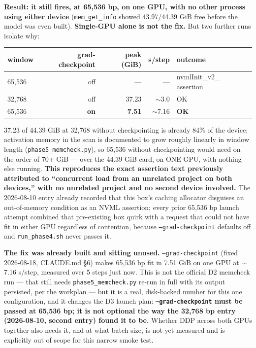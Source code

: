 \documentclass[11pt,a4paper]{article}
\newcommand{\code}[1]{\texttt{\small #1}}
\begin{document}
\textbf{Result: it still fires, at 65,536 bp, on one GPU, with no other process
using either device} (\code{mem\_get\_info} showed 43.97/44.39 GiB free before
the model was even built). \textbf{Single-GPU alone is not the fix.} But two
further runs isolate why:

\begin{center}
\begin{tabular}{lrrrl}
\toprule
window & grad-checkpoint & peak (GiB) & s/step & outcome \\
\midrule
65,536 & off & --- & --- & nvmlInit\_v2\_ assertion \\
32,768 & off & 37.23 & $\sim$3.0 & OK \\
65,536 & \textbf{on} & \textbf{7.51} & $\sim$7.16 & \textbf{OK} \\
\bottomrule
\end{tabular}
\end{center}

37.23 of 44.39 GiB at 32,768 without checkpointing is already 84\% of the
device; activation memory in the scan is documented to grow roughly linearly
in window length (\code{phase5\_memcheck.py}), so 65,536 without checkpointing
would need on the order of 70+ GiB --- over the 44.39 GiB card, on ONE GPU,
with nothing else running. \textbf{This reproduces the exact assertion text
previously attributed to ``concurrent load from an unrelated project on both
devices,'' with no unrelated project and no second device involved.} The
2026-08-10 entry already recorded that this box's caching allocator disguises
an out-of-memory condition as an NVML assertion; every prior 65,536 bp launch
attempt combined that pre-existing box quirk with a request that could not
have fit in either GPU regardless of contention, because \code{--grad-checkpoint}
defaults off and \code{run\_phase4.sh} never passes it.

\textbf{The fix was already built and sitting unused.} \code{--grad-checkpoint}
(fixed 2026-08-18, CLAUDE.md \S6) makes 65,536 bp fit in 7.51 GiB on one GPU at
$\sim$7.16 s/step, measured over 5 steps just now. This is not the official
D2 memcheck run --- that still needs \code{phase5\_memcheck.py} re-run in full
with its output persisted, per the workplan --- but it is a real, disk-backed
number for this one configuration, and it changes the D3 launch plan:
\textbf{\code{--grad-checkpoint} must be passed at 65,536 bp; it is not
optional the way the 32,768 bp entry (2026-08-10, second entry) found it to
be.} Whether DDP across both GPUs together also needs it, and at what batch
size, is not yet measured and is explicitly out of scope for this narrow
smoke test.
\end{document}
